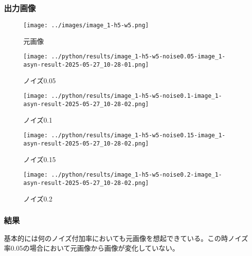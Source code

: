 \documentclass{ltjsarticle}
\begin{document}
\subsubsection{出力画像}
\begin{figure}[h]
  \centering
  \begin{minipage}[b]{0.18\columnwidth}
      \centering
      \texttt{[image: ../images/image\_1-h5-w5.png]}
      \caption{元画像}
  \end{minipage}
  \begin{minipage}[b]{0.18\columnwidth}
      \centering
      \texttt{[image: ../python/results/image\_1-h5-w5-noise0.05-image\_1-asyn-result-2025-05-27\_10-28-01.png]}
      \caption{ノイズ0.05}
  \end{minipage}
  \begin{minipage}[b]{0.18\columnwidth}
      \centering
      \texttt{[image: ../python/results/image\_1-h5-w5-noise0.1-image\_1-asyn-result-2025-05-27\_10-28-02.png]}
      \caption{ノイズ0.1}
  \end{minipage}
  \begin{minipage}[b]{0.18\columnwidth}
      \centering
      \texttt{[image: ../python/results/image\_1-h5-w5-noise0.15-image\_1-asyn-result-2025-05-27\_10-28-02.png]}
      \caption{ノイズ0.15}
  \end{minipage}
  \begin{minipage}[b]{0.18\columnwidth}
      \centering
      \texttt{[image: ../python/results/image\_1-h5-w5-noise0.2-image\_1-asyn-result-2025-05-27\_10-28-02.png]}
      \caption{ノイズ0.2}
  \end{minipage}
\end{figure}
\subsubsection{結果}
基本的には何のノイズ付加率においても元画像を想起できている。この時ノイズ率0.05の場合において元画像から画像が変化していない。
\newpage
\end{document}
